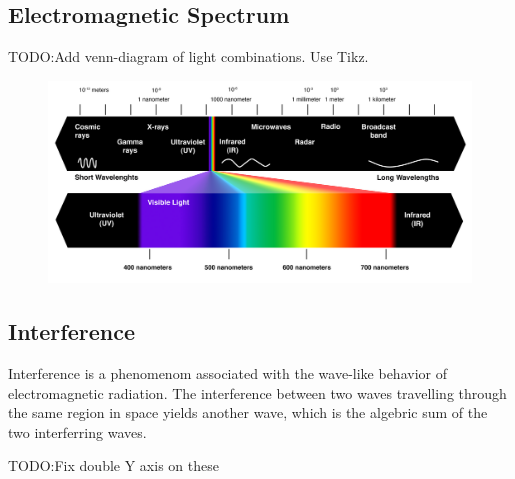 \documentclass{article}[10pt]
\begin{document}
\subsection{Electromagnetic Spectrum}
TODO:\@ Add venn-diagram of light combinations. Use Tikz.
\begin{figure}[H]
    \centering
\includegraphics[scale=0.65]{radiations}
\end{figure}
\subsection{Interference}
Interference is a phenomenom associated with the wave-like behavior of
electromagnetic radiation. The interference between two waves travelling through
the same region in space yields another wave, which is the algebric sum of the
two interferring waves.

TODO:\@ Fix double Y axis on these
\end{document}
